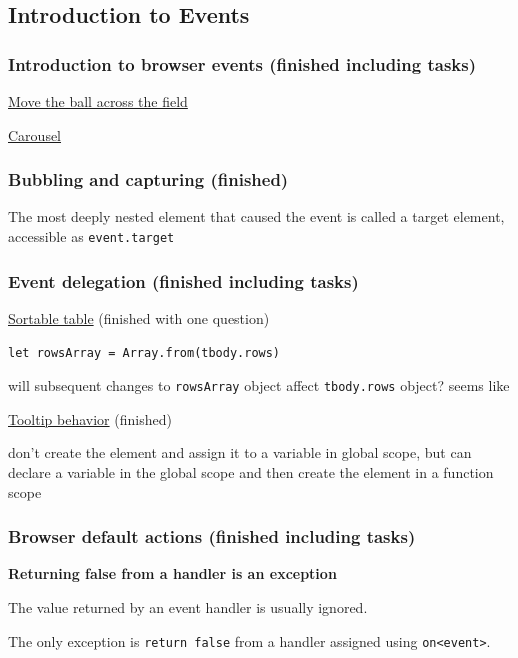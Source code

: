 \documentclass[a4paper, 12pt]{article}
\begin{document}
\subsection{Introduction to Events}
\subsubsection{Introduction to browser events (finished including tasks)}

\href{https://javascript.info/introduction-browser-events#move-the-ball-across-the-field}{Move the ball across the field}

\href{https://javascript.info/introduction-browser-events#carousel}{Carousel}

\subsubsection{Bubbling and capturing (finished)}
The most deeply nested element that caused the event is called a target element, accessible as \verb|event.target|

\subsubsection{Event delegation (finished including tasks)}

\href{https://javascript.info/event-delegation#sortable-table}{Sortable table} (finished with one question)

\verb|let rowsArray = Array.from(tbody.rows)|

will subsequent changes to \verb|rowsArray| object affect \verb|tbody.rows| object? seems like

\href{https://javascript.info/event-delegation#tooltip-behavior}{Tooltip behavior} (finished)

don't create the element and assign it to a variable in global scope, but can declare a variable in the global scope and then create the element in a function scope

\subsubsection{Browser default actions (finished including tasks)}
\textbf{Returning false from a handler is an exception}

The value returned by an event handler is usually ignored.

The only exception is \verb|return false| from a handler assigned using \verb|on<event>|.
\end{document}
